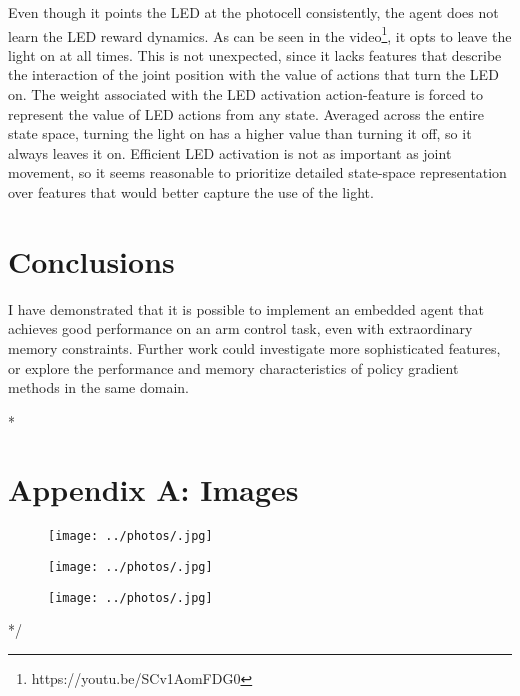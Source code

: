 \documentclass{article}
\begin{document}
Even though it points the LED at the photocell consistently, the agent does not learn the LED reward dynamics. As can be seen in the video\footnote{https://youtu.be/SCv1AomFDG0}, it opts to leave the light on at all times. This is not unexpected, since it lacks features that describe the interaction of the joint position with the value of actions that turn the LED on. The weight associated with the LED activation action-feature is forced to represent the value of LED actions from any state. Averaged across the entire state space, turning the light on has a higher value than turning it off, so it always leaves it on. Efficient LED activation is not as important as joint movement, so it seems reasonable to prioritize detailed state-space representation over features that would better capture the use of the light.



\section{Conclusions}

I have demonstrated that it is possible to implement an embedded agent that achieves good performance on an arm control task, even with extraordinary memory constraints. Further work could investigate more sophisticated features, or explore the performance and memory characteristics of policy gradient methods in the same domain.

\clearpage

\/*
\section{Appendix A: Images}

	\begin{figure}[!htb]
		\centering
		\texttt{[image: ../photos/.jpg]}
		\label{fig:}
	\end{figure}
	
	\begin{figure}[!htb]
		\centering
		\texttt{[image: ../photos/.jpg]}
		\caption{}
		\label{fig:}
	\end{figure}
	
	\begin{figure}[!htb]
		\centering
		\texttt{[image: ../photos/.jpg]}
		\caption{}
		\label{fig:}
	\end{figure}
*/
\end{document}
